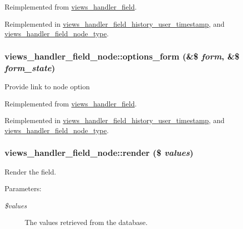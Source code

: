 Reimplemented from \hyperlink{classviews__handler__field_64c69a8a3697603f8283405071c25b76}{views\_\-handler\_\-field}.

Reimplemented in \hyperlink{classviews__handler__field__history__user__timestamp_2cedbce8f02c9c051606c89e6d349e6b}{views\_\-handler\_\-field\_\-history\_\-user\_\-timestamp}, and \hyperlink{classviews__handler__field__node__type_4e50103a014bff96644915cb0c8d33fd}{views\_\-handler\_\-field\_\-node\_\-type}.\hypertarget{classviews__handler__field__node_f3d8a04be282a20079ea4fb82e768910}{
\subsubsection[{options\_\-form}]{\setlength{\rightskip}{0pt plus 5cm}views\_\-handler\_\-field\_\-node::options\_\-form (\&\$ {\em form}, \/  \&\$ {\em form\_\-state})}}
\label{classviews__handler__field__node_f3d8a04be282a20079ea4fb82e768910}


Provide link to node option 

Reimplemented from \hyperlink{classviews__handler__field_0435d161922b7b4b84f02a2e79bb947a}{views\_\-handler\_\-field}.

Reimplemented in \hyperlink{classviews__handler__field__history__user__timestamp_785f6784b015c681b25f58573b1e6859}{views\_\-handler\_\-field\_\-history\_\-user\_\-timestamp}, and \hyperlink{classviews__handler__field__node__type_0152124a453b32265e512bace19d6de4}{views\_\-handler\_\-field\_\-node\_\-type}.\hypertarget{classviews__handler__field__node_fe7681e1188ad74ce9b604ad3ba864c0}{
\subsubsection[{render}]{\setlength{\rightskip}{0pt plus 5cm}views\_\-handler\_\-field\_\-node::render (\$ {\em values})}}
\label{classviews__handler__field__node_fe7681e1188ad74ce9b604ad3ba864c0}


Render the field.

\begin{Desc}
\item[Parameters:]
\begin{description}
\item[{\em \$values}]The values retrieved from the database. \end{description}
\end{Desc}


